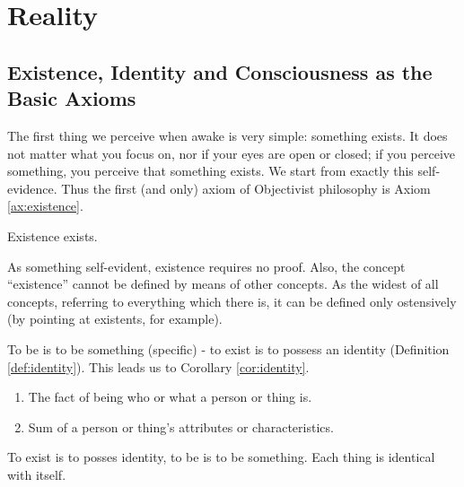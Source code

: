 \chapter{Reality}

    \section{Existence, Identity and Consciousness as the Basic Axioms}

        The first thing we perceive when awake is very simple: something exists. It does not matter what you focus on, nor if your eyes are open or closed; if you perceive something, you perceive that something exists. We start from exactly this self-evidence. Thus the first (and only) axiom of Objectivist philosophy is Axiom \ref{ax:existence}.
    
            \begin{axiom}[Existence]
            \label{ax:existence}
                Existence exists.
            \end{axiom}
            
        As something self-evident, existence requires no proof. Also, the concept ``existence'' cannot be defined by means of other concepts. As the widest of all concepts, referring to everything which there is, it can be defined only ostensively (by pointing at existents, for example).

        To be is to be something (specific) - to exist is to possess an identity (Definition \ref{def:identity}). This leads us to Corollary \ref{cor:identity}.
            
            \begin{definition}[Identity]
            \label{def:identity}
                \begin{enumerate}
                    \item The fact of being who or what a person or thing is.
                    \item Sum of a person or thing's attributes or characteristics.
                \end{enumerate}
            \end{definition}
        
            \begin{corollary}
            \label{cor:identity}
                To exist is to posses identity, to be is to be something. Each thing is identical with itself.
            \end{corollary}

